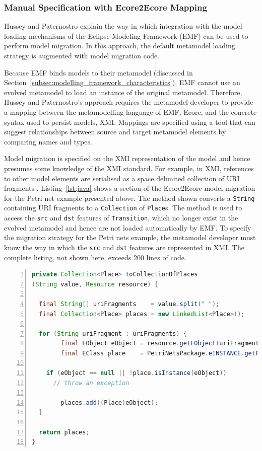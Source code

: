 \subsubsection{Manual Specification with Ecore2Ecore Mapping}
\label{subsubsec:ecore2ecore}
Hussey and Paternostro \cite{hussey06advanced} explain the way in which integration with the model loading mechanisms of the Eclipse Modeling Framework (EMF) \cite{steinberg09emf} can be used to perform model migration. In this approach, the default metamodel loading strategy is augmented with model migration code.

Because EMF binds models to their metamodel (discussed in Section~\ref{subsec:modelling_framework_characteristics}), EMF cannot use an evolved metamodel to load an instance of the original metamodel. Therefore, Hussey and Paternostro's approach requires the metamodel developer to provide a mapping between the metamodelling language of EMF, Ecore, and the concrete syntax used to persist models, XMI. Mappings are specified using a tool that can suggest relationships between source and target metamodel elements by comparing names and types.

Model migration is specified on the XMI representation of the model and hence presumes some knowledge of the XMI standard. For example, in XMI, references to other model elements are serialised as a space delimited collection of URI fragments \cite{steinberg09emf}. Listing~\ref{lst:java} shows a section of the Ecore2Ecore model migration for the Petri net example presented above. The method shown converts a \texttt{String} containing URI fragments to a \texttt{Collection} of \texttt{Place}s. The method is used to access the \texttt{src} and \texttt{dst} features of \texttt{Transition}, which no longer exist in the evolved metamodel and hence are not loaded automatically by EMF. To specify the migration strategy for the Petri nets example, the metamodel developer must know the way in which the \texttt{src} and \texttt{dst} features are represented in XMI. The complete listing, not shown here, exceeds 200 lines of code.

\begin{lstlisting}[basicstyle=\ttfamily\footnotesize, flexiblecolumns=true, numbers=left, nolol=true, caption=Java method for deserialising a reference., label=lst:java, language=Java, tabsize=2]
private Collection<Place> toCollectionOfPlaces
(String value, Resource resource) {

  final String[] uriFragments    = value.split(" ");
  final Collection<Place> places = new LinkedList<Place>();
 
  for (String uriFragment : uriFragments) {
		final EObject eObject = resource.getEObject(uriFragment);
		final EClass place    = PetriNetsPackage.eINSTANCE.getPlace();

    if (eObject == null || !place.isInstance(eObject))
      // throw an exception
						
		places.add((Place)eObject);
  }
 
  return places;
}
\end{lstlisting}

